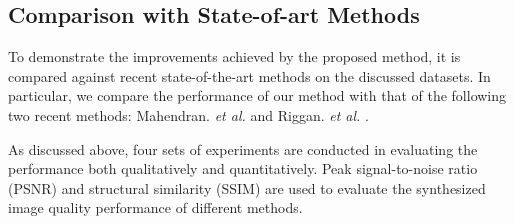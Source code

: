 \documentclass[10pt,twocolumn,letterpaper]{article}
\begin{document}


\subsection{Comparison with State-of-art Methods}  

To demonstrate the improvements achieved by the proposed method, it is compared against recent state-of-the-art methods on the discussed datasets.   In particular, we compare the performance of our method with that of the following two recent methods: Mahendran.  \emph{et al.} \cite{inverting_cnn}
and  Riggan. \emph{et al.} \cite{btas_2016}. 

As discussed above, four sets of experiments are conducted in evaluating the performance both qualitatively and quantitatively.   Peak signal-to-noise ratio (PSNR) and structural similarity (SSIM) \cite{ssim} are used to evaluate the synthesized image quality  performance of different methods.  
\end{document}
